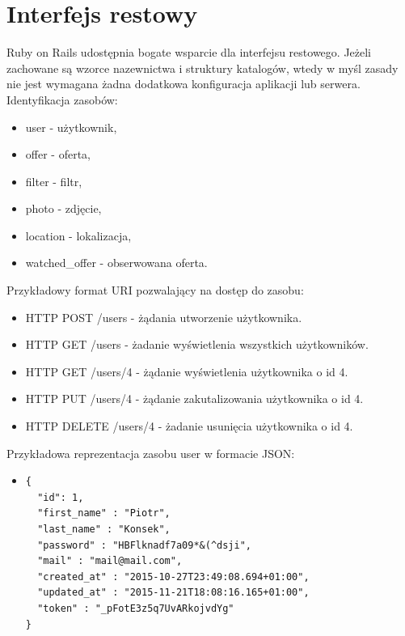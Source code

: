 \section{Interfejs restowy}
\label{sec:interfejsRestowy}
Ruby on Rails udostępnia bogate wsparcie dla interfejsu restowego.\cite{rails} Jeżeli zachowane są wzorce nazewnictwa i struktury katalogów, wtedy w myśl zasady  nie jest wymagana żadna dodatkowa konfiguracja aplikacji lub serwera.\\
Identyfikacja zasobów:
\begin{itemize}
\item user - użytkownik,
\item offer - oferta,
\item filter - filtr,
\item photo - zdjęcie,
\item location - lokalizacja,
\item watched\_offer - obserwowana oferta.
\end{itemize}
Przykładowy format URI pozwalający na dostęp do zasobu:
\begin{itemize}
\item HTTP POST /users - żądania utworzenie użytkownika.
\item HTTP GET /users - żadanie wyświetlenia wszystkich użytkowników.
\item HTTP GET /users/4 - żądanie wyświetlenia użytkownika o id 4.
\item HTTP PUT /users/4 - żądanie zakutalizowania użytkownika o id 4.
\item HTTP DELETE /users/4 - żadanie usunięcia użytkownika o id 4.
\end{itemize}
Przykładowa reprezentacja zasobu user w formacie JSON:
\begin{itemize}
\item \begin{lstlisting}
{
  "id": 1,
  "first_name" : "Piotr",
  "last_name" : "Konsek",
  "password" : "HBFlknadf7a09*&(^dsji",
  "mail" : "mail@mail.com",
  "created_at" : "2015-10-27T23:49:08.694+01:00",
  "updated_at" : "2015-11-21T18:08:16.165+01:00",
  "token" : "_pFotE3z5q7UvARkojvdYg"
}
\end{lstlisting}
\end{itemize}



